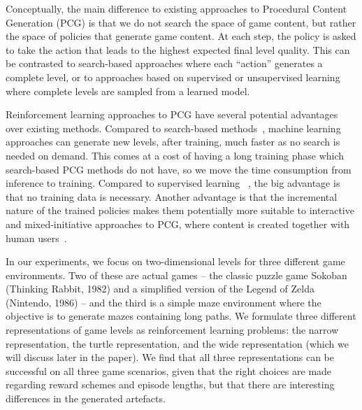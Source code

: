 \documentclass[letterpaper]{article} %
\begin{document}
Conceptually, the main difference to existing approaches to Procedural Content Generation (PCG) is that we do not search the space of game content, but rather the space of policies that generate game content. At each step, the policy is asked to take the action that leads to the highest expected final level quality. This can be contrasted to search-based approaches where each ``action'' generates a complete level, or to approaches based on supervised or unsupervised learning where complete levels are sampled from a learned model.

Reinforcement learning approaches to PCG have several potential advantages over existing methods. Compared to search-based methods~\cite{togelius2011search}, machine learning approaches can generate new levels, after training, much faster as no search is needed on demand. This comes at a cost of having a long training phase which search-based PCG methods do not have, so we move the time consumption from inference to training. Compared to supervised learning ~\cite{summerville2018procedural}, the big advantage is that no training data is necessary. Another advantage is that the incremental nature of the trained policies makes them potentially more suitable to interactive and mixed-initiative approaches to PCG, where content is created together with human users~\cite{yannakakis2014mixed}.

In our experiments, we focus on two-dimensional levels for three different game environments. Two of these are actual games -- the classic puzzle game Sokoban (Thinking Rabbit, 1982) and a simplified version of the Legend of Zelda (Nintendo, 1986) -- and the third is a simple maze environment where the objective is to generate mazes containing long paths. We formulate three different representations of game levels as reinforcement learning problems: the narrow representation, the turtle representation, and the wide representation (which we will discuss later in the paper).
We find that all three representations can be successful on all three game scenarios, given that the right choices are made regarding reward schemes and episode lengths, but that there are interesting differences in the generated artefacts.
\end{document}
